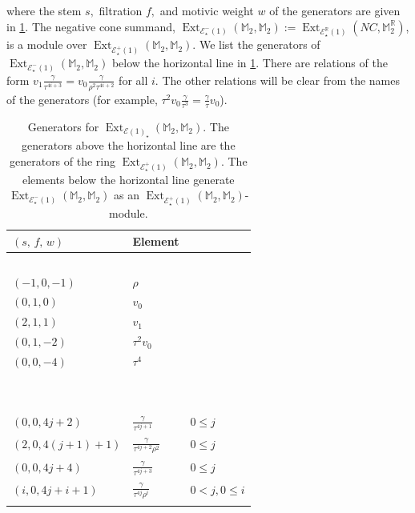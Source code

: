 \documentclass{amsart}
\theoremstyle{plain}
\numberwithin{equation}{section}
\numberwithin{figure}{section}
\DeclareMathOperator{\Ext}{Ext}
\newcommand{\mM}{{\mathbb M}}
\newcommand{\mR}{{\mathbb R}}
\newcommand{\cE}{{\mathcal E}}
\newcommand{\0}{\langle 0 \rangle }
\begin{document}
where the stem $s,$ filtration $f,$ and motivic weight $w$ of the generators are given in \cref{tab:ExtM2M2gens}. The negative cone summand, $\Ext_{\cE_\star^{-} (1)} (\mM_2, \mM_2):= \Ext_{\cE_{\star}^{\mR} (1)} (NC, \mM_2^{\mR})$, is a module over $\Ext_{\cE_\star^{+} (1)} (\mM_2, \mM_2)$. We list the generators of $\Ext_{\cE_\star^{-} (1)} (\mM_2, \mM_2)$ below the horizontal line in \cref{tab:ExtM2M2gens}.  There are relations of the form $v_{1}\frac{\gamma}{\tau^{4i + 3}} = v_{0}\frac{\gamma}{\rho^{2}\tau^{4i + 2}}$ for all $i$. The other relations will be clear from the names of the generators (for example, $\tau^{2}v_{0}\frac{\gamma}{\tau^{3}} = \frac{\gamma}{\tau} v_{0}$).
\begin{table}[ht]
    \centering
    \begin{tabular}{l l l}
          $(s,\, f,\, w)$ & Element & \\
            \hline
             $\,$ & $\,$ \\
             $(-1, 0, -1)$ & $\rho$ \\
             $(0, 1, 0)$ & $v_0$ \\
            $(2, 1, 1)$ & $v_1$ \\
            $(0, 1, -2)$ & $\tau^2 v_0$ \\
            $(0, 0, -4)$ & $\tau^4$ \\
           $\,$ & $\,$ \\
           \hline
           \, & \, \\
           $(0,0, 4j+2)$ & $\frac{\gamma}
           {\tau^{4j + 1}}$ & $0 \le j$\\
           $\left(2,0,4(j+1) + 1\right)$ & $\frac{\gamma}
           {\tau^{4j + 2}\rho^{2}}$ & $0 \le j$ \\
           $(0,0,4j + 4)$ & $\frac{\gamma}
           {\tau^{4j + 3}}$ & $0 \le j$ \\
           $(i,0,  4j  + i + 1)$ & $\frac{\gamma}
           {\tau^{4j}\rho^{i}}$ & $0 < j, 0 \le i$ \\
           \label{ExtM2gens}
    \end{tabular}
    \caption{Generators for $\Ext_{\cE (1)_\star} (\mM_2, \mM_2)$. The generators above the horizontal line are the generators of the ring $\Ext_{\cE^{+}_\star (1)} (\mM_2, \mM_2)$. The elements below the horizontal line generate $\Ext_{\cE^{-}_\star (1)} (\mM_2, \mM_2)$ as an $\Ext_{\cE^{+}_\star (1)} (\mM_2, \mM_2)$-module.}
    \label{tab:ExtM2M2gens}
\end{table}
\end{document}
